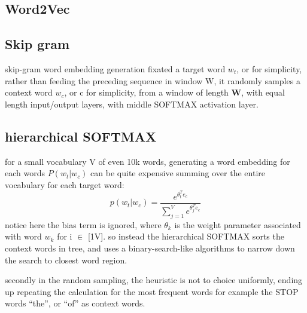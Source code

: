 \documentclass[4apaper,12pt]{book}
\begin{document}
\begin{description}
\begin{description}
\begin{description}
          \subsection{Word2Vec}
            \subsection{Skip gram}
            \begin{description}
            \item skip-gram word embedding generation fixated a target word $w_t$, or for simplicity, rather than feeding the preceding sequence in window W, it randomly samples a context word $w_c$, or c for simplicity, from a window of length \textbf{W}, with equal length input/output layers, with middle SOFTMAX activation layer.

              \subsection{hierarchical SOFTMAX}
              \begin{description}
              \item for a small vocabulary V of even 10k words, generating a word embedding for each words $P(w_t|w_c)$ can be quite expensive summing over the entire vocabulary for each target word: $$ p(w_t|w_c) = \frac{e^{\theta_t^Te_c}}{\sum_{j=1}^Ve^{\theta_j^Te_c}}$$ notice here the bias term is ignored, where $\theta_k$ is the weight parameter associated with word $w_k$ for i $\in$ [1\text{-}V]. so instead the hierarchical SOFTMAX sorts the context words in tree, and uses a binary-search-like algorithms to narrow down the search to closest word region.
                \item
              \item secondly in the random sampling, the heuristic is not to choice uniformly, ending up repeating the calculation for the most frequent words for example the STOP words ``the'', or ``of'' as context words.
                \end{description}
            \end{description}

\end{description}
\end{description}
\end{description}
\end{document}
